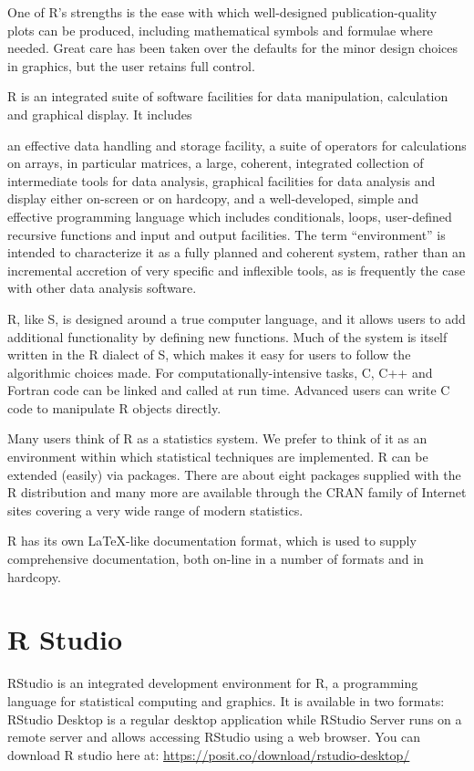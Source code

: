 \documentclass[
]{book}
\begin{document}
One of R's strengths is the ease with which well-designed publication-quality plots can be produced, including mathematical symbols and formulae where needed. Great care has been taken over the defaults for the minor design choices in graphics, but the user retains full control.

R is an integrated suite of software facilities for data manipulation, calculation and graphical display. It includes

an effective data handling and storage facility,
a suite of operators for calculations on arrays, in particular matrices,
a large, coherent, integrated collection of intermediate tools for data analysis,
graphical facilities for data analysis and display either on-screen or on hardcopy, and
a well-developed, simple and effective programming language which includes conditionals, loops, user-defined recursive functions and input and output facilities.
The term ``environment'' is intended to characterize it as a fully planned and coherent system, rather than an incremental accretion of very specific and inflexible tools, as is frequently the case with other data analysis software.

R, like S, is designed around a true computer language, and it allows users to add additional functionality by defining new functions. Much of the system is itself written in the R dialect of S, which makes it easy for users to follow the algorithmic choices made. For computationally-intensive tasks, C, C++ and Fortran code can be linked and called at run time. Advanced users can write C code to manipulate R objects directly.

Many users think of R as a statistics system. We prefer to think of it as an environment within which statistical techniques are implemented. R can be extended (easily) via packages. There are about eight packages supplied with the R distribution and many more are available through the CRAN family of Internet sites covering a very wide range of modern statistics.

R has its own LaTeX-like documentation format, which is used to supply comprehensive documentation, both on-line in a number of formats and in hardcopy.

\hypertarget{r-studio}{%
\section{R Studio}\label{r-studio}}

RStudio is an integrated development environment for R, a programming language for statistical computing and graphics. It is available in two formats: RStudio Desktop is a regular desktop application while RStudio Server runs on a remote server and allows accessing RStudio using a web browser.
You can download R studio here at: \url{https://posit.co/download/rstudio-desktop/}
\end{document}
